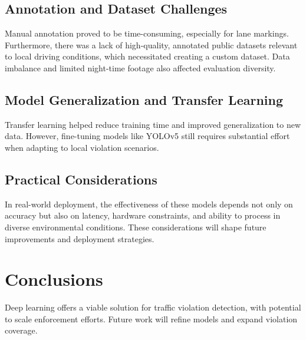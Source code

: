 \documentclass[12pt,a4paper]{article}
\begin{document}
\subsection{Annotation and Dataset Challenges}
Manual annotation proved to be time-consuming, especially for lane markings. Furthermore, there was a lack of high-quality, annotated public datasets relevant to local driving conditions, which necessitated creating a custom dataset. Data imbalance and limited night-time footage also affected evaluation diversity.

\subsection{Model Generalization and Transfer Learning}
Transfer learning helped reduce training time and improved generalization to new data. However, fine-tuning models like YOLOv5 still requires substantial effort when adapting to local violation scenarios.

\subsection{Practical Considerations}
In real-world deployment, the effectiveness of these models depends not only on accuracy but also on latency, hardware constraints, and ability to process in diverse environmental conditions. These considerations will shape future improvements and deployment strategies.

\section{Conclusions}
Deep learning offers a viable solution for traffic violation detection, with potential to scale enforcement efforts. Future work will refine models and expand violation coverage.

\newpage
\end{document}
